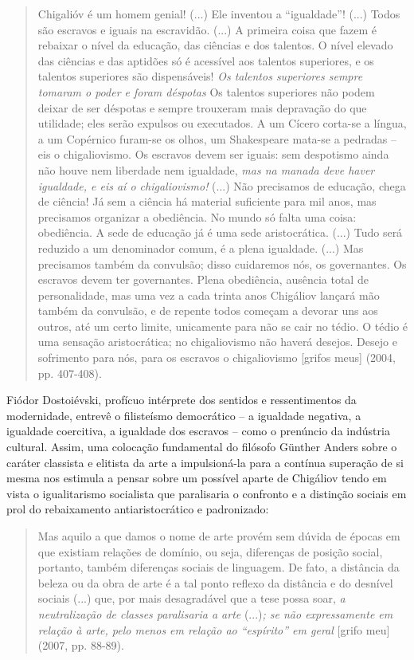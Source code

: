 \begin{quote}
Chigalióv é um homem genial! (...) Ele inventou a ``igualdade''! (...)
Todos são escravos e iguais na escravidão. (...) A primeira coisa que
fazem é rebaixar o nível da educação, das ciências e dos talentos. O
nível elevado das ciências e das aptidões só é acessível aos talentos
superiores, e os talentos superiores são dispensáveis! \emph{Os talentos
superiores sempre tomaram o poder e foram déspotas} Os talentos
superiores não podem deixar de ser déspotas e sempre trouxeram mais
depravação do que utilidade; eles serão expulsos ou executados. A um
Cícero corta-se a língua, a um Copérnico furam-se os olhos, um
Shakespeare mata-se a pedradas -- eis o chigaliovismo. Os escravos devem
ser iguais: sem despotismo ainda não houve nem liberdade nem igualdade,
\emph{mas na manada deve haver igualdade, e eis aí o chigaliovismo!}
(...) Não precisamos de educação, chega de ciência! Já sem a ciência há
material suficiente para mil anos, mas precisamos organizar a
obediência. No mundo só falta uma coisa: obediência. A sede de educação
já é uma sede aristocrática. (...) Tudo será reduzido a um denominador
comum, é a plena igualdade. (...) Mas precisamos também da convulsão;
disso cuidaremos nós, os governantes. Os escravos devem ter governantes.
Plena obediência, ausência total de personalidade, mas uma vez a cada
trinta anos Chigáliov lançará mão também da convulsão, e de repente
todos começam a devorar uns aos outros, até um certo limite, unicamente
para não se cair no tédio. O tédio é uma sensação aristocrática; no
chigaliovismo não haverá desejos. Desejo e sofrimento para nós, para os
escravos o chigaliovismo {[}grifos meus{]} (2004, pp. 407-408).
\end{quote}

Fiódor Dostoiévski, profícuo intérprete dos sentidos e ressentimentos da
modernidade, entrevê o filisteísmo democrático -- a igualdade negativa,
a igualdade coercitiva, a igualdade dos escravos -- como o prenúncio da
indústria cultural. Assim, uma colocação fundamental do filósofo Günther
Anders sobre o caráter classista e elitista da arte a impulsioná-la para
a contínua superação de si mesma nos estimula a pensar sobre um possível
aparte de Chigáliov tendo em vista o igualitarismo socialista que
paralisaria o confronto e a distinção sociais em prol do rebaixamento
antiaristocrático e padronizado:

\begin{quote}
Mas aquilo a que damos o nome de arte provém sem dúvida de épocas em que
existiam relações de domínio, ou seja, diferenças de posição social,
portanto, também diferenças sociais de linguagem. De fato, a distância
da beleza ou da obra de arte é a tal ponto reflexo da distância e do
desnível sociais (...) que, por mais desagradável que a tese possa soar,
\emph{a neutralização de classes paralisaria a arte} (...)\emph{; se não
expressamente em relação à arte, pelo menos em relação ao ``espírito''
em geral} {[}grifo meu{]} (2007, pp. 88-89).
\end{quote}

